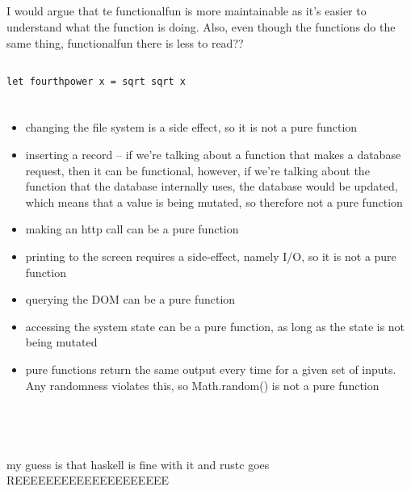 \documentclass[letterpaper]{article}
\begin{document}
\subsection{}
I would argue that te functionalfun is more maintainable as it's easier to
understand what the function is doing. Also, even though the functions do the
same thing, functionalfun there is less to read?? \todo{}

\subsection{}
\begin{verbatim}
let fourthpower x = sqrt sqrt x
\end{verbatim}

\section{}
\begin{itemize}
  \item changing the file system is a side effect, so it is not a pure function
  \item inserting a record -- if we're talking about a function that makes a
    database request, then it can be functional, however, if we're talking about
    the function that the database internally uses, the database would be
    updated, which means that a value is being mutated, so therefore not a pure
    function
  \item making an http call can be a pure function
  \item printing to the screen requires a side-effect, namely I/O, so it is not
    a pure function
  \item querying the DOM can be a pure function
  \item accessing the system state can be a pure function, as long as the state
    is not being mutated
  \item pure functions return the same output every time for a given set of
    inputs. Any randomness violates this, so Math.random() is not a pure
    function
\end{itemize}


\section{}
\inputminted[]{rust}{7.rs}

\section{}

\section{}
my guess is that haskell is fine with it and rustc goes REEEEEEEEEEEEEEEEEEEE
\end{document}
